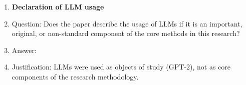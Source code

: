 \begin{enumerate}
\item {\bf Declaration of LLM usage}
    \item[] Question: Does the paper describe the usage of LLMs if it is an important, original, or non-standard component of the core methods in this research?
    \item[] Answer: \answerNA{}
    \item[] Justification: LLMs were used as objects of study (GPT-2), not as core components of the research methodology.

\end{enumerate}
